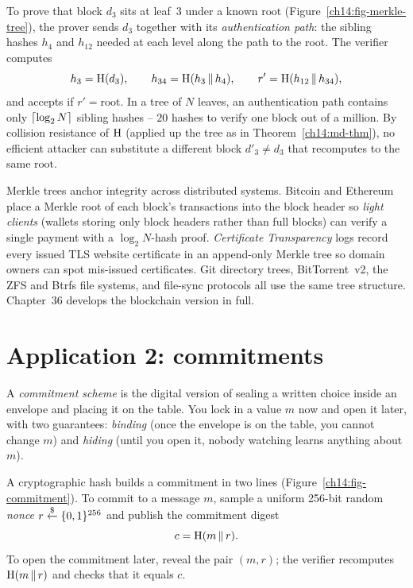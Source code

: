 To prove that block $d_3$ sits at leaf~3 under a known $\text{root}$ (Figure~\ref{ch14:fig-merkle-tree}), the prover sends $d_3$ together with its \emph{authentication path}: the sibling hashes $h_4$ and $h_{12}$ needed at each level along the path to the root. The verifier computes
\[
  h_3 = \operatorname{H}(d_3), \qquad
  h_{34} = \operatorname{H}(h_3 \,\|\, h_4), \qquad
  r' = \operatorname{H}(h_{12} \,\|\, h_{34}),
\]
and accepts if $r' = \text{root}$. In a tree of $N$ leaves, an authentication path contains only $\lceil\log_2 N\rceil$ sibling hashes -- $20$ hashes to verify one block out of a million. By collision resistance of $\operatorname{H}$ (applied up the tree as in Theorem~\ref{ch14:md-thm}), no efficient attacker can substitute a different block $d'_3 \ne d_3$ that recomputes to the same $\text{root}$.

\begin{applicationbox}
Merkle trees anchor integrity across distributed systems. Bitcoin and Ethereum place a Merkle root of each block's transactions into the block header so \emph{light clients} (wallets storing only block headers rather than full blocks) can verify a single payment with a $\log_2 N$-hash proof. \emph{Certificate Transparency} logs record every issued TLS website certificate in an append-only Merkle tree so domain owners can spot mis-issued certificates. Git directory trees, BitTorrent~v2, the ZFS and Btrfs file systems, and file-sync protocols all use the same tree structure. Chapter~36 develops the blockchain version in full.
\end{applicationbox}

\section{Application 2: commitments}
\label{ch14:commitments}

A \emph{commitment scheme} is the digital version of sealing a written choice inside an envelope and placing it on the table. You lock in a value $m$ now and open it later, with two guarantees: \emph{binding} (once the envelope is on the table, you cannot change $m$) and \emph{hiding} (until you open it, nobody watching learns anything about $m$).

A cryptographic hash builds a commitment in two lines (Figure~\ref{ch14:fig-commitment}). To commit to a message $m$, sample a uniform 256-bit random \emph{nonce} $r \stackrel{\$}{\gets} \{0,1\}^{256}$ and publish the commitment digest
\[
  c = \operatorname{H}(m \,\|\, r).
\]
To open the commitment later, reveal the pair $(m, r)$; the verifier recomputes $\operatorname{H}(m \,\|\, r)$ and checks that it equals $c$.

